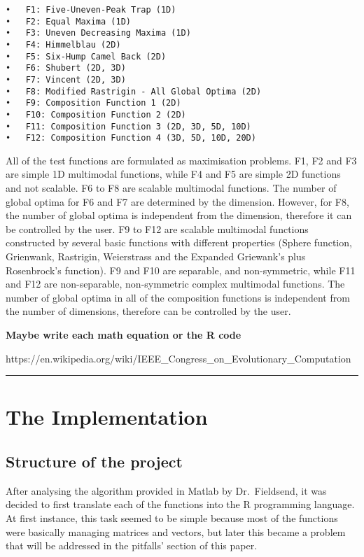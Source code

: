 \documentclass[12pt,a4paper]{article}
\begin{document}
\begin{verbatim}
•   F1: Five-Uneven-Peak Trap (1D)
•   F2: Equal Maxima (1D)
•   F3: Uneven Decreasing Maxima (1D)
•   F4: Himmelblau (2D)
•   F5: Six-Hump Camel Back (2D)
•   F6: Shubert (2D, 3D)
•   F7: Vincent (2D, 3D)
•   F8: Modified Rastrigin - All Global Optima (2D)
•   F9: Composition Function 1 (2D)
•   F10: Composition Function 2 (2D)
•   F11: Composition Function 3 (2D, 3D, 5D, 10D)
•   F12: Composition Function 4 (3D, 5D, 10D, 20D)
\end{verbatim}

All of the test functions are formulated as maximisation problems. F1,
F2 and F3 are simple 1D multimodal functions, while F4 and F5 are simple
2D functions and not scalable. F6 to F8 are scalable multimodal
functions. The number of global optima for F6 and F7 are determined by
the dimension. However, for F8, the number of global optima is
independent from the dimension, therefore it can be controlled by the
user. F9 to F12 are scalable multimodal functions constructed by several
basic functions with different properties (Sphere function, Grienwank,
Rastrigin, Weierstrass and the Expanded Griewank's plus Rosenbrock's
function). F9 and F10 are separable, and non-symmetric, while F11 and
F12 are non-separable, non-symmetric complex multimodal functions. The
number of global optima in all of the composition functions is
independent from the number of dimensions, therefore can be controlled
by the user.

\textbf{Maybe write each math equation or the R code}

https://en.wikipedia.org/wiki/IEEE\_Congress\_on\_Evolutionary\_Computation

\begin{center}\rule{0.5\linewidth}{\linethickness}\end{center}

\section{The Implementation}\label{the-implementation}

\subsection{Structure of the project}\label{structure-of-the-project}

After analysing the algorithm provided in Matlab by Dr.~Fieldsend, it
was decided to first translate each of the functions into the R
programming language. At first instance, this task seemed to be simple
because most of the functions were basically managing matrices and
vectors, but later this became a problem that will be addressed in the
pitfalls' section of this paper.
\end{document}
